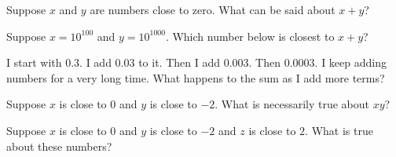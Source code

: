 \documentclass{ximera}
\begin{document}
\begin{problem}
  Suppose $x$ and $y$ are numbers close to zero.  What can be said about $x+y$?
  \begin{multipleChoice}
  \end{multipleChoice}
\end{problem}

\begin{problem}
  Suppose $x = 10^{100}$ and $y = 10^{1000}$.  Which number below is closest to $x + y$?
  \begin{multipleChoice}
  \end{multipleChoice}
\end{problem}

\begin{problem}
	I start with $0.3$.  I add $0.03$ to it.  Then I add $0.003$.  Then $0.0003$.  I keep adding numbers for a very long time.  What happens to the sum as I add more terms?
	\begin{multipleChoice}
	\end{multipleChoice}
\end{problem}



\begin{problem}
  Suppose $x$ is close to $0$ and $y$ is close to $-2$.  What is necessarily true about $xy$?
  \begin{multipleChoice}
  \end{multipleChoice}
\end{problem}

\begin{problem}
  Suppose $x$ is close to $0$ and $y$ is close to $-2$ and $z$ is close to $2$.  What is true about these numbers?
  \begin{multipleChoice}
  \end{multipleChoice}
\end{problem}
\end{document}
